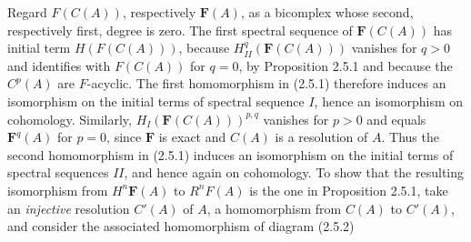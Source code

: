 Regard $F(C(A))$, respectively $\mathbf F(A)$, as a bicomplex whose second,
respectively first, degree is zero. The first spectral sequence of
$\mathbf F(C(A))$ has initial term $H(F(C(A)))$, because
$H_{II}^q(\mathbf F(C(A)))$ vanishes for $q>0$ and identifies with
$F(C(A))$ for $q=0$, by Proposition 2.5.1 and because the $C^p(A)$ are
$F$-acyclic. The first homomorphism in (2.5.1) therefore induces an
isomorphism on the initial terms of spectral sequence $I$, hence an
isomorphism on cohomology. Similarly,
$H_I(\mathbf F(C(A)))^{p,q}$ vanishes for $p>0$ and equals
$\mathbf F^q(A)$ for $p=0$, since $\mathbf F$ is exact and $C(A)$ is a
resolution of $A$. Thus the second homomorphism in (2.5.1) induces an
isomorphism on the initial terms of spectral sequences $II$, and hence again
on cohomology. To show that the resulting isomorphism from
$H^n\mathbf F(A)$ to $R^nF(A)$ is the one in Proposition 2.5.1, take an
\textit{injective} resolution $C'(A)$ of $A$, a homomorphism from $C(A)$ to $C'(A)$,
and consider the associated homomorphism of diagram (2.5.2)

